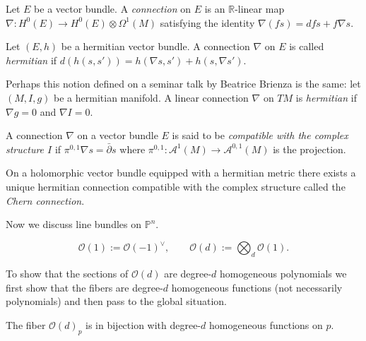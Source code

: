 \documentclass{book}
\begin{document}
\begin{definition}
\label{definition-connection-vector-bundle}
Let $E$ be a vector bundle.
A {\it connection} on $E$ is an
$\mathbb{R}$-linear map
$\nabla:H^0(E)\to H^0(E) \otimes \Omega^1(M)$
satisfying the identity
$\nabla(fs)=dfs + f\nabla s$.
\end{definition}

\begin{definition}
\label{definition-hermitian-connection}
\begin{reference}
\cite[Definition 4.2.9]{huc}
\end{reference}
Let $(E,h)$ be a hermitian vector bundle.
A connection $\nabla$ on $E$ is called
{\it hermitian} if
$d(h(s,s'))=h(\nabla s,s')+h(s,\nabla s')$.
\end{definition}

\noindent
Perhaps this notion defined on a seminar
talk by Beatrice Brienza is the same:
let $(M,I,g)$ be a hermitian manifold. A
linear connection $\nabla$ on $TM$ is
{\it hermitian} if
$\nabla g=0$ and $\nabla I =0$.

\begin{definition}
\label{definition-holomorphic-connection}
A connection $\nabla$ on a vector bundle $E$
is said to be {\it compatible with the
complex structure $I$} if
$\pi^{0,1}\nabla s=\bar\partial s$
where $\pi^{0,1}:\mathcal{A}^1(M)
\to \mathcal{A}^{0,1}(M)$ is the projection.
\end{definition}

\begin{proposition}
\label{proposition-chern-connection}
On a holomorphic vector bundle
equipped with a hermitian metric there exists
a unique hermitian connection
compatible with the complex structure
called the {\it Chern connection}.
\end{proposition}

\medskip\noindent
Now we discuss line bundles on
$\mathbb{P}^n$.

\begin{definition}
\label{definition-line-bundles-in-pn}
$$
\mathcal{O}(1):=\mathcal{O}(-1)^\vee,\qquad
\mathcal{O}(d):=\bigotimes_d \mathcal{O}(1).
$$
\end{definition}

\noindent
To show that the sections of $\mathcal{O}(d)$
are degree-$d$ homogeneous polynomials we
first
show that the fibers are degree-$d$
homogeneous functions
(not necessarily polynomials)
and then pass to the global situation.

\begin{lemma}
\label{lemma-fiber-od-homog-degre-d-funct}
The fiber $\mathcal{O}(d)_p$ is in bijection
with
degree-$d$ homogeneous functions on $p$.
\end{lemma}
\end{document}
